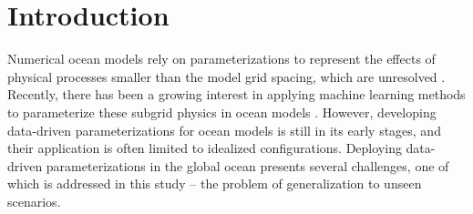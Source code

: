 \documentclass[draft]{agujournal2019}
\begin{document}
%


%
%
%
%

\section{Introduction}
Numerical ocean models rely on parameterizations to represent the effects of physical processes smaller than the model grid spacing, which are unresolved \cite{fox2019challenges, hewitt2020resolving, christensen2022parametrization}. %
Recently, there has been a growing interest in applying machine learning methods to parameterize these subgrid physics in ocean models \cite{Bolton2019, zanna2020data, guillaumin2021stochastic, zhang2023implementation, Sane2023, yan2024choice, perezhogin2024stable, maddison2024online}. However, developing data-driven parameterizations for ocean models is still in its early stages, and their application is often limited to idealized configurations. Deploying data-driven parameterizations in the global ocean presents several challenges, one of which is addressed in this study -- the problem of generalization to unseen scenarios.
\end{document}
